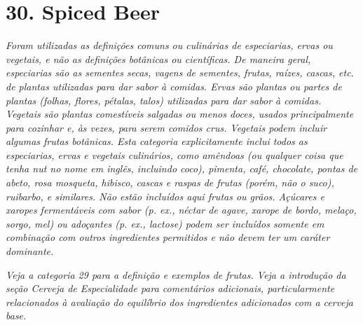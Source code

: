 \section*{30. Spiced Beer}
\textit{Foram utilizadas as definições comuns ou culinárias de especiarias, ervas ou vegetais, e não as definições botânicas ou científicas. De maneira geral, especiarias são as sementes secas, vagens de sementes, frutas, raízes, cascas, etc. de plantas utilizadas para dar sabor à comidas. Ervas são plantas ou partes de plantas (folhas, flores, pétalas, talos) utilizadas para dar sabor à comidas. Vegetais são plantas comestíveis salgadas ou menos doces, usados principalmente para cozinhar e, às vezes, para serem comidos crus. Vegetais podem incluir algumas frutas botânicas. Esta categoria explicitamente inclui todos as especiarias, ervas e vegetais culinários, como amêndoas (ou qualquer coisa que tenha nut no nome em inglês, incluindo coco), pimenta, café, chocolate, pontas de abeto, rosa mosqueta, hibisco, cascas e raspas de frutas (porém, não o suco), ruibarbo, e similares. Não estão incluídos aqui frutas ou grãos. Açúcares e xaropes fermentáveis com sabor (p. ex., néctar de agave, xarope de bordo, melaço, sorgo, mel) ou adoçantes (p. ex., lactose) podem ser incluídos somente em combinação com outros ingredientes permitidos e não devem ter um caráter dominante.}

\textit{Veja a categoria 29 para a definição e exemplos de frutas. Veja a introdução da seção Cerveja de Especialidade para comentários adicionais, particularmente relacionados à avaliação do equilíbrio dos ingredientes adicionados com a cerveja base.}
